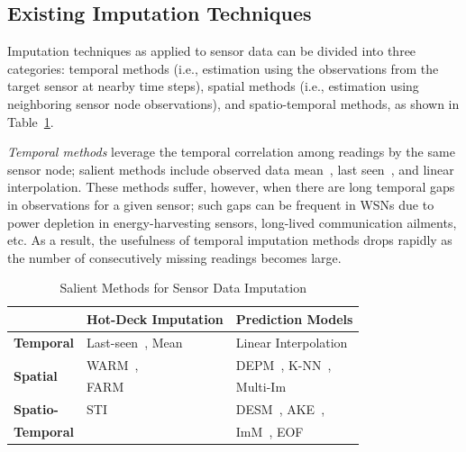 
\subsection{Existing Imputation Techniques}

Imputation techniques as applied to sensor data can be divided into three categories:
temporal methods (i.e., estimation using the observations from the target sensor at nearby time steps), 
spatial methods (i.e., estimation using neighboring sensor node observations), 
and spatio-temporal methods, as shown in Table~\ref{tbl:methods}.


{\em Temporal methods} leverage the temporal correlation among
readings by the same sensor node; salient methods include observed
data mean~\cite{madden2005tinydb}, last
seen~\cite{Granger:lastseen}, and linear interpolation.  These methods
suffer, however, when there are long temporal gaps in observations for a given
sensor; such gaps can be frequent in WSNs due to power depletion in
energy-harvesting sensors, long-lived communication ailments, etc.  
As a result, the usefulness of temporal imputation
methods drops rapidly as the number of consecutively missing readings
becomes large.


\begin{table}
\caption{Salient Methods for Sensor Data Imputation}
\label{tbl:methods}
\centering
{\small
\begin{tabular}{|l|l|l|} \hline
   &{\bf Hot-Deck Imputation}&{\bf Prediction Models}\\ \hline
{\bf Temporal} & Last-seen~\cite{Granger:lastseen}, Mean& Linear Interpolation\\ \hline
\multirow{2}{*}{\bf Spatial}& WARM~\cite{le2005estimating},& DEPM~\cite{li2008data}, K-NN~\cite{pan2010k},\\ 
&FARM~\cite{Gruenwald:FARM}&Multi-Im~\cite{yuan2000multiple}\\\hline
{\bf Spatio-}&STI~\cite{Jian-Zhong:STI}&DESM~\cite{li2008data}, AKE~\cite{pan2010k},\\
{\bf Temporal}&&ImM~\cite{Lim:robust}, EOF~\cite{beckers2003eof} \\\hline \end{tabular}
}
\vspace{-0.1in}
\end{table}


